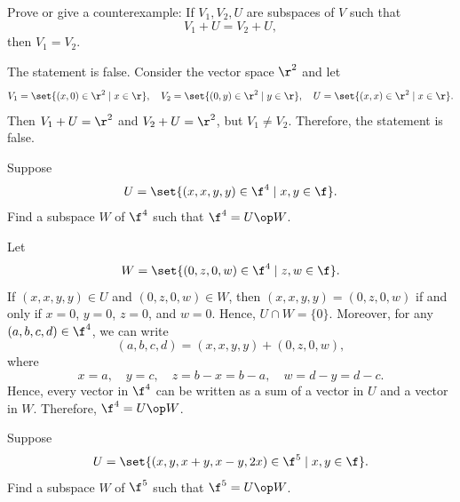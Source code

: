 \begin{exercise}[1c19]
    Prove or give a counterexample: If $V_1, V_2, U$ are subspaces of $V$ such that
    \[V_1 + U = V_2 + U,\]
    then $V_1 = V_2$.
\end{exercise}

\begin{sol}
    The statement is false. Consider the vector space $\r^2$ and let
    \[V_1 = \set{(x, 0) \in \r^2 \mid x \in \r}, \quad V_2 = \set{(0, y) \in \r^2 \mid y \in \r}, \quad U = \set{(x, x) \in \r^2 \mid x \in \r}.\]
    Then $V_1 + U = \r^2$ and $V_2 + U = \r^2$, but $V_1 \neq V_2$. Therefore, the statement is false.
\end{sol}

\begin{exercise}[1c20]
    Suppose
    \[U = \set{(x, x, y, y) \in \f^4 \mid x, y \in \f}.\]
    Find a subspace $W$ of $\f^4$ such that $\f^4 = U \op W$.
\end{exercise}

\begin{sol}
    Let
    \[W = \set{(0, z, 0, w) \in \f^4 \mid z, w \in \f}.\]
    If $(x, x, y, y) \in U$ and $(0, z, 0, w) \in W$, then $(x, x, y, y) = (0, z, 0, w)$ if and only if $x = 0$, $y = 0$, $z = 0$, and $w = 0$. Hence, $U \cap W = \{0\}$. Moreover, for any $(a, b, c, d) \in \f^4$, we can write
    \[(a, b, c, d) = (x, x, y, y) + (0, z, 0, w),\]
    where
    \[x = a, \quad y = c, \quad z = b - x = b - a, \quad w = d - y = d - c.\]
    Hence, every vector in $\f^4$ can be written as a sum of a vector in $U$ and a vector in $W$. Therefore, $\f^4 = U \op W$.
\end{sol}

\begin{exercise}[1c21]
    Suppose
    \[U = \set{(x, y, x + y, x - y, 2x) \in \f^5 \mid x, y \in \f}.\]
    Find a subspace $W$ of $\f^5$ such that $\f^5 = U \op W$.
\end{exercise}

